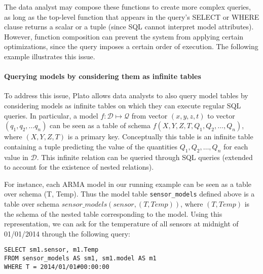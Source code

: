 The data analyst may compose these functions to create more complex queries, as long as the top-level function that appears in the query's SELECT or WHERE clause returns a scalar or a tuple (since SQL cannot interpret model attributes). However, function composition can prevent the system from applying certain optimizations, since the query imposes a certain order of execution. The following example illustrates this issue.

\vspace*{0.5cm}
\begin{example}
\end{example}
\vspace*{0.5cm}

\paragraph{Querying models by considering them as infinite tables} To address this issue, Plato allows data analysts to also query model tables by considering models as infinite tables on which they can execute regular SQL queries. In particular, a model $f: \mathcal{D} \mapsto \mathcal{Q}$ from vector $(x, y, z, t)$ to vector $(q_1, q_2, \ldots q_n)$ can be seen as a table of schema $f(X, Y, Z, T, Q_1, Q_2, \ldots, Q_n)$, where $(X, Y, Z, T)$ is a primary key. Conceptually this table is an infinite table containing a tuple predicting the value of the quantities $Q_1, Q_2, \ldots, Q_n$ for each value in $\mathcal{D}$.  This infinite relation can be queried through SQL queries (extended to account for the existence of nested relations).

\vspace*{0.5cm}
\begin{example}
\label{xmpl:query-infinite-tables}
For instance, each ARMA model in our running example can be seen as a table over schema (T, Temp). Thus the model table \texttt{sensor\_models} defined above is a table over schema $sensor\_models(sensor, (T, Temp))$, where $(T, Temp)$ is the schema of the nested table corresponding to the model. Using this representation, we can ask for the temperature of all sensors at midnight of 01/01/2014 through the following query:

\begin{verbatim}
SELECT sm1.sensor, m1.Temp
FROM sensor_models AS sm1, sm1.model AS m1
WHERE T = 2014/01/01#00:00:00
\end{verbatim}
\end{example}
\vspace*{0.5cm}

